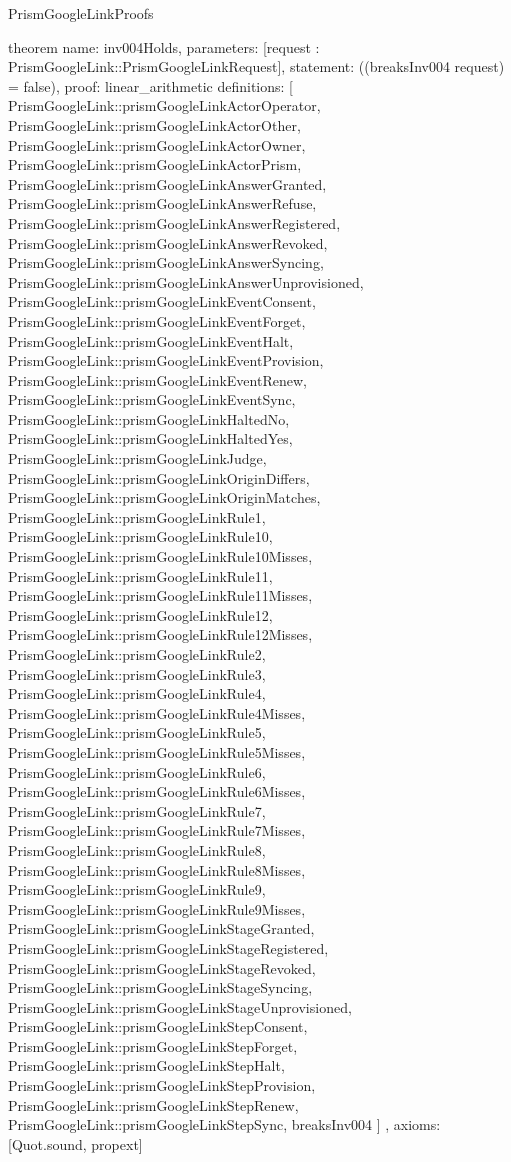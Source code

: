 \begin{lexlean}{PrismGoogleLinkProofs}
\begin{semanticmodule}
theorem{
  name: inv004Holds,
  parameters: [request : PrismGoogleLink::PrismGoogleLinkRequest],
  statement: ((breaksInv004 request) = false),
  proof: linear_arithmetic{
    definitions: [
      PrismGoogleLink::prismGoogleLinkActorOperator,
      PrismGoogleLink::prismGoogleLinkActorOther,
      PrismGoogleLink::prismGoogleLinkActorOwner,
      PrismGoogleLink::prismGoogleLinkActorPrism,
      PrismGoogleLink::prismGoogleLinkAnswerGranted,
      PrismGoogleLink::prismGoogleLinkAnswerRefuse,
      PrismGoogleLink::prismGoogleLinkAnswerRegistered,
      PrismGoogleLink::prismGoogleLinkAnswerRevoked,
      PrismGoogleLink::prismGoogleLinkAnswerSyncing,
      PrismGoogleLink::prismGoogleLinkAnswerUnprovisioned,
      PrismGoogleLink::prismGoogleLinkEventConsent,
      PrismGoogleLink::prismGoogleLinkEventForget,
      PrismGoogleLink::prismGoogleLinkEventHalt,
      PrismGoogleLink::prismGoogleLinkEventProvision,
      PrismGoogleLink::prismGoogleLinkEventRenew,
      PrismGoogleLink::prismGoogleLinkEventSync,
      PrismGoogleLink::prismGoogleLinkHaltedNo,
      PrismGoogleLink::prismGoogleLinkHaltedYes,
      PrismGoogleLink::prismGoogleLinkJudge,
      PrismGoogleLink::prismGoogleLinkOriginDiffers,
      PrismGoogleLink::prismGoogleLinkOriginMatches,
      PrismGoogleLink::prismGoogleLinkRule1,
      PrismGoogleLink::prismGoogleLinkRule10,
      PrismGoogleLink::prismGoogleLinkRule10Misses,
      PrismGoogleLink::prismGoogleLinkRule11,
      PrismGoogleLink::prismGoogleLinkRule11Misses,
      PrismGoogleLink::prismGoogleLinkRule12,
      PrismGoogleLink::prismGoogleLinkRule12Misses,
      PrismGoogleLink::prismGoogleLinkRule2,
      PrismGoogleLink::prismGoogleLinkRule3,
      PrismGoogleLink::prismGoogleLinkRule4,
      PrismGoogleLink::prismGoogleLinkRule4Misses,
      PrismGoogleLink::prismGoogleLinkRule5,
      PrismGoogleLink::prismGoogleLinkRule5Misses,
      PrismGoogleLink::prismGoogleLinkRule6,
      PrismGoogleLink::prismGoogleLinkRule6Misses,
      PrismGoogleLink::prismGoogleLinkRule7,
      PrismGoogleLink::prismGoogleLinkRule7Misses,
      PrismGoogleLink::prismGoogleLinkRule8,
      PrismGoogleLink::prismGoogleLinkRule8Misses,
      PrismGoogleLink::prismGoogleLinkRule9,
      PrismGoogleLink::prismGoogleLinkRule9Misses,
      PrismGoogleLink::prismGoogleLinkStageGranted,
      PrismGoogleLink::prismGoogleLinkStageRegistered,
      PrismGoogleLink::prismGoogleLinkStageRevoked,
      PrismGoogleLink::prismGoogleLinkStageSyncing,
      PrismGoogleLink::prismGoogleLinkStageUnprovisioned,
      PrismGoogleLink::prismGoogleLinkStepConsent,
      PrismGoogleLink::prismGoogleLinkStepForget,
      PrismGoogleLink::prismGoogleLinkStepHalt,
      PrismGoogleLink::prismGoogleLinkStepProvision,
      PrismGoogleLink::prismGoogleLinkStepRenew,
      PrismGoogleLink::prismGoogleLinkStepSync,
      breaksInv004
    ]
  },
  axioms: [Quot.sound, propext]
}


\end{semanticmodule}
\end{lexlean}
